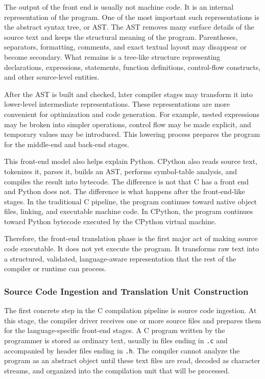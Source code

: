 The output of the front end is usually not machine code. It is an internal representation of the program. One of the most important such representations is the abstract syntax tree, or AST. The AST removes many surface details of the source text and keeps the structural meaning of the program. Parentheses, separators, formatting, comments, and exact textual layout may disappear or become secondary. What remains is a tree-like structure representing declarations, expressions, statements, function definitions, control-flow constructs, and other source-level entities.

After the AST is built and checked, later compiler stages may transform it into lower-level intermediate representations. These representations are more convenient for optimization and code generation. For example, nested expressions may be broken into simpler operations, control flow may be made explicit, and temporary values may be introduced. This lowering process prepares the program for the middle-end and back-end stages.

This front-end model also helps explain Python. CPython also reads source text, tokenizes it, parses it, builds an AST, performs symbol-table analysis, and compiles the result into bytecode. The difference is not that C has a front end and Python does not. The difference is what happens after the front-end-like stages. In the traditional C pipeline, the program continues toward native object files, linking, and executable machine code. In CPython, the program continues toward Python bytecode executed by the CPython virtual machine.

Therefore, the front-end translation phase is the first major act of making source code executable. It does not yet execute the program. It transforms raw text into a structured, validated, language-aware representation that the rest of the compiler or runtime can process.

\subsubsection{Source Code Ingestion and Translation Unit Construction}

The first concrete step in the C compilation pipeline is source code ingestion. At this stage, the compiler driver receives one or more source files and prepares them for the language-specific front-end stages. A C program written by the programmer is stored as ordinary text, usually in files ending in \texttt{.c} and accompanied by header files ending in \texttt{.h}. The compiler cannot analyze the program as an abstract object until these text files are read, decoded as character streams, and organized into the compilation unit that will be processed.

